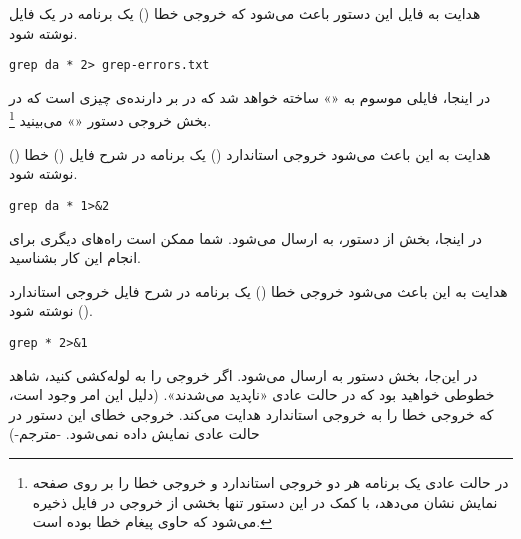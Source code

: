 \begin{example}{هدایت  به فایل}
این دستور باعث می‌شود که خروجی خطا () یک برنامه در یک فایل نوشته شود‌.

\begin{latin}
\begin{lstlisting}
grep da * 2> grep-errors.txt
\end{lstlisting}
\end{latin}

در اینجا‌، فایلی موسوم به «» ساخته خواهد شد که در بر دارنده‌ی چیزی
است که در بخش  خروجی دستور
«‌»
می‌بینید
\footnote{
در حالت عادی یک برنامه هر دو خروجی استاندارد و خروجی خطا را بر روی صفحه نمایش نشان
می‌دهد، با کمک
 در این دستور تنها بخشی از خروجی در فایل ذخیره می‌شود که حاوی
پیغام خطا بوده است.
}.
\end{example}

\begin{example}{هدایت  به }
این باعث می‌شود خروجی استاندارد
() 
یک برنامه در شرح فایل
()
خطا
() نوشته شود.

\begin{latin}
\begin{lstlisting}
grep da * 1>&2
\end{lstlisting}
\end{latin}

در اینجا‌، بخش  از دستور، به  ارسال می‌شود. شما ممکن است راه‌های دیگری برای
انجام این کار بشناسید‌.
\end{example}

\begin{example}{هدایت  به }
این باعث می‌شود خروجی خطا () یک برنامه در شرح فایل خروجی استاندارد ()
نوشته شود.

\begin{latin}
\begin{lstlisting}
grep * 2>&1
\end{lstlisting}
\end{latin}

در این‌جا‌، بخش  دستور به  ارسال می‌شود. اگر خروجی را به  لوله‌کشی
کنید، شاهد خطوطی خواهید بود‌ که در حالت عادی «ناپدید می‌شدند». (دلیل این امر وجود
 است، که خروجی خطا را به خروجی استاندارد هدایت می‌کند. خروجی خطای این دستور
در حالت عادی نمایش داده نمی‌شود. -مترجم-)
\end{example}

